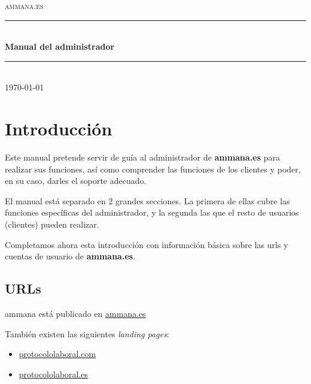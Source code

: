 \documentclass[12pt, spanish]{article}
\begin{document}

    \begin{titlepage}
        \newcommand { \HRule } { \rule {\linewidth} {0.5mm} }
        \center
        \textsc {\LARGE ammana.es} \\ [1.5cm]
        \HRule \\ [0.4cm]
        { \huge \bfseries Manual del administrador } \\ [0.4cm]
        \HRule \\ [1.5cm]
        { \large \today } \\ [3cm]
        \vfill
    \end{titlepage}


    \tableofcontents


    \newpage

    \section{Introducción}

        Este manual pretende servir de guía al administrador de \textbf{ammana.es} para 
    realizar sus funciones, así como comprender las funciones de los clientes y poder, en
    su caso, darles el soporte adecuado.

        El manual está separado en 2 grandes secciones. La primera de ellas cubre las funciones
    específicas del administrador, y la segunda las que el resto de usuarios (clientes) pueden
    realizar.

        Completamos ahora esta introducción con información básica sobre las urls y cuentas de
    usuario de \textbf{ammana.es}.


    \subsection{URLs}

        ammana está publicado en \url{ammana.es}

        También existen las siguientes {\em landing pages}:
        \begin{itemize}
            \item \url{protocololaboral.com}
            \item \url{protocololaboral.es}
        \end{itemize}
\end{document}

